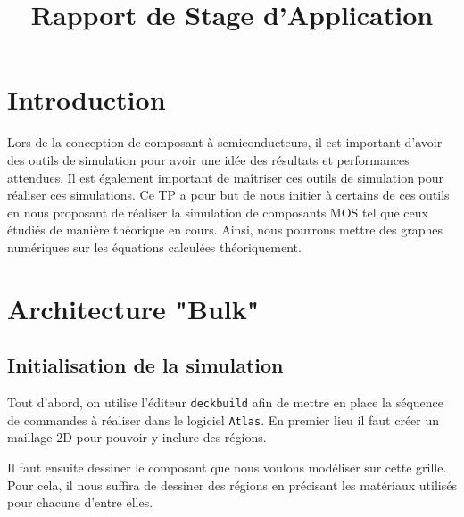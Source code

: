 \documentclass[a4paper,11pt]{report}
\title{Rapport de Stage d'Application}
\begin{document}


\chapter{Introduction}
Lors de la conception de composant à semiconducteurs, il est important d'avoir des outils de simulation pour avoir une idée des résultats et performances attendues. Il est également important de maîtriser ces outils de simulation pour réaliser ces simulations. Ce TP a pour but de nous initier à certains de ces outils en nous proposant de réaliser la simulation de composants MOS tel que ceux étudiés de manière théorique en cours. Ainsi, nous pourrons mettre des graphes  numériques sur les équations calculées théoriquement.

\chapter{Architecture "Bulk"}

\section{Initialisation de la simulation}

Tout d'abord, on utilise l'éditeur \texttt{deckbuild} afin de mettre en place la séquence de commandes à réaliser dans le logiciel \texttt{Atlas}. En premier lieu il faut créer un maillage 2D pour pouvoir y inclure des régions.
\vspace{0.3cm}

\noindent{}
\vspace{0.3cm}

Il faut ensuite dessiner le composant que nous voulons modéliser sur cette grille. Pour cela, il nous suffira de dessiner des régions en précisant les matériaux utilisés pour chacune d'entre elles.
\vspace{0.3cm}
\end{document}
